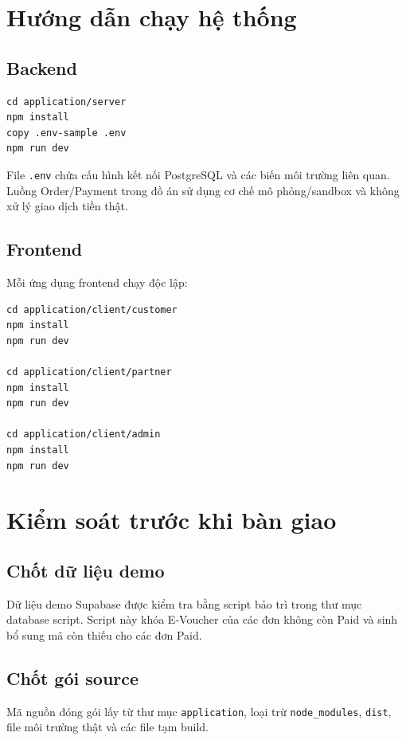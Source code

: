 \section{Hướng dẫn chạy hệ thống}

\subsection{Backend}

\begin{lstlisting}
cd application/server
npm install
copy .env-sample .env
npm run dev
\end{lstlisting}

File \texttt{.env} chứa cấu hình kết nối PostgreSQL và các biến môi trường liên quan. Luồng Order/\allowbreak Payment trong đồ án sử dụng cơ chế mô phỏng/sandbox và không xử lý giao dịch tiền thật.

\subsection{Frontend}

Mỗi ứng dụng frontend chạy độc lập:

\begin{lstlisting}
cd application/client/customer
npm install
npm run dev

cd application/client/partner
npm install
npm run dev

cd application/client/admin
npm install
npm run dev
\end{lstlisting}

\section{Kiểm soát trước khi bàn giao}

\subsection{Chốt dữ liệu demo}

Dữ liệu demo Supabase được kiểm tra bằng script bảo trì trong thư mục database script. Script này khóa E-Voucher của các đơn không còn Paid và sinh bổ sung mã còn thiếu cho các đơn Paid.

\subsection{Chốt gói source}

Mã nguồn đóng gói lấy từ thư mục \texttt{application}, loại trừ \texttt{node\_modules}, \texttt{dist}, file môi trường thật và các file tạm build.

